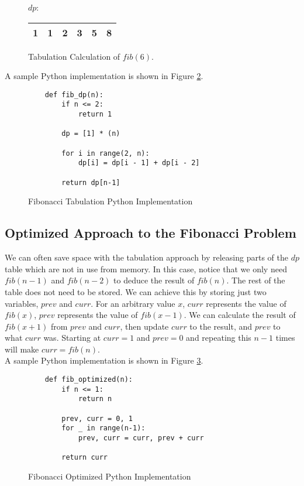 \begin{figure}[H]
    \centering
    $dp$:
    \begin{table}[H]
        \centering
        \begin{tabular}{|c|c|c|c|c|c|}
            \hline
            1 & 1 & 2 & 3 & 5 & 8 \\
            \hline
        \end{tabular}
    \end{table}
    \caption{Tabulation Calculation of $fib(6)$.}
    \label{fig:fibonacci-dp-table}
\end{figure}

A sample Python implementation is shown in Figure \ref{fig:fibonacci-dp}.

\begin{figure}[H]
    \centering
    \begin{lstlisting}
    def fib_dp(n):
        if n <= 2:
            return 1

        dp = [1] * (n)

        for i in range(2, n):
            dp[i] = dp[i - 1] + dp[i - 2]

        return dp[n-1]
    \end{lstlisting}
    \caption{Fibonacci Tabulation Python Implementation}
    \label{fig:fibonacci-dp}
\end{figure}
\newpage

\subsection{Optimized Approach to the Fibonacci Problem}
We can often save space with the tabulation
approach by releasing parts of the $dp$ table which are not in use from memory.
In this case, notice that we only need $fib(n-1)$ and $fib(n-2)$ to deduce the result of $fib(n)$.
The rest of the table does not need to be stored. 
We can achieve this by storing just two variables, $prev$ and $curr$.
For an arbitrary value $x$, $curr$ represents the value of $fib(x)$, $prev$ represents the value of $fib(x-1)$.
We can calculate the result of $fib(x+1)$ from $prev$ and $curr$, then update $curr$ to the result, and $prev$ to what $curr$ was.
Starting at $curr=1$ and $prev=0$ and repeating this $n-1$ times will make $curr = fib(n)$.\\

A sample Python implementation is shown in Figure \ref{fig:fibonacci-optimized}.
\begin{figure}[H]
    \centering
    \begin{lstlisting}
    def fib_optimized(n):
        if n <= 1:
            return n
        
        prev, curr = 0, 1
        for _ in range(n-1):
            prev, curr = curr, prev + curr
            
        return curr
    \end{lstlisting}
    \caption{Fibonacci Optimized Python Implementation}
    \label{fig:fibonacci-optimized}
\end{figure}

